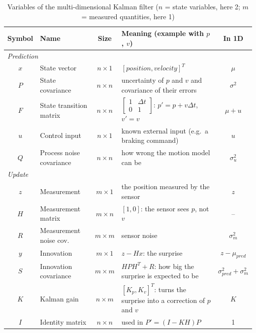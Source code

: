 \begin{table}[H]
    \centering
    \small
    \begin{tabular}{|c|l|c|p{6.8cm}|c|}
        \hline
        \textbf{Symbol} & \textbf{Name} & \textbf{Size} & \textbf{Meaning (example with $p$, $v$)} & \textbf{In 1D} \\
        \hline
        \multicolumn{5}{|l|}{\textit{Prediction}} \\
        \hline
        $x$ & State vector & $n\times1$ & $[position, velocity]^T$ & $\mu$ \\
        \hline
        $P$ & State covariance & $n\times n$ & uncertainty of $p$ and $v$ and covariance of their errors & $\sigma^2$ \\
        \hline
        $F$ & State transition matrix & $n\times n$ & $\begin{bmatrix}1 & \Delta t\\ 0 & 1\end{bmatrix}$: $p' = p + v\Delta t$, $v' = v$ & $\mu + u$ \\
        \hline
        $u$ & Control input & $n\times1$ & known external input (e.g.\ a braking command) & $u$ \\
        \hline
        $Q$ & Process noise covariance & $n\times n$ & how wrong the motion model can be & $\sigma^2_u$ \\
        \hline
        \multicolumn{5}{|l|}{\textit{Update}} \\
        \hline
        $z$ & Measurement & $m\times1$ & the position measured by the sensor & $z$ \\
        \hline
        $H$ & Measurement matrix & $m\times n$ & $[1, 0]$: the sensor sees $p$, not $v$ & -- \\
        \hline
        $R$ & Measurement noise cov. & $m\times m$ & sensor noise & $\sigma^2_m$ \\
        \hline
        $y$ & Innovation & $m\times1$ & $z - Hx$: the surprise & $z - \mu_{pred}$ \\
        \hline
        $S$ & Innovation covariance & $m\times m$ & $HPH^T + R$: how big the surprise is expected to be & $\sigma^2_{pred} + \sigma^2_m$ \\
        \hline
        $K$ & Kalman gain & $n\times m$ & $[K_p, K_v]^T$: turns the surprise into a correction of $p$ and $v$ & $K$ \\
        \hline
        $I$ & Identity matrix & $n\times n$ & used in $P' = (I - KH)P$ & 1 \\
        \hline
    \end{tabular}
    \caption{Variables of the multi-dimensional Kalman filter ($n$ = state variables, here 2; $m$ = measured quantities, here 1)}
\end{table}

